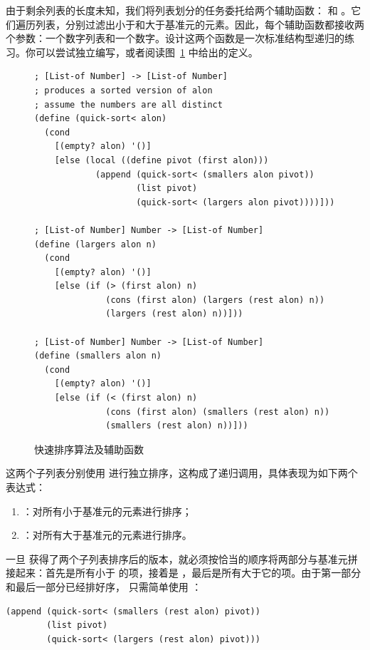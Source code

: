 由于剩余列表的长度未知，我们将列表划分的任务委托给两个辅助函数： 和 。它们遍历列表，分别过滤出小于和大于基准元的元素。因此，每个辅助函数都接收两个参数：一个数字列表和一个数字。设计这两个函数是一次标准结构型递归的练习。你可以尝试独立编写，或者阅读图~\ref{fig:quicksort-full} 中给出的定义。

\begin{figure}[htbp]
  \centering
\begin{lstlisting}[language=BSL, basicstyle=\scriptsize\ttfamily]
; [List-of Number] -> [List-of Number]
; produces a sorted version of alon
; assume the numbers are all distinct
(define (quick-sort< alon)
  (cond
    [(empty? alon) '()]
    [else (local ((define pivot (first alon)))
            (append (quick-sort< (smallers alon pivot))
                    (list pivot)
                    (quick-sort< (largers alon pivot))))]))

; [List-of Number] Number -> [List-of Number]
(define (largers alon n)
  (cond
    [(empty? alon) '()]
    [else (if (> (first alon) n)
              (cons (first alon) (largers (rest alon) n))
              (largers (rest alon) n))]))

; [List-of Number] Number -> [List-of Number]
(define (smallers alon n)
  (cond
    [(empty? alon) '()]
    [else (if (< (first alon) n)
              (cons (first alon) (smallers (rest alon) n))
              (smallers (rest alon) n))]))
\end{lstlisting}
  \caption{快速排序算法及辅助函数}
  \label{fig:quicksort-full}
\end{figure}

这两个子列表分别使用  进行独立排序，这构成了递归调用，具体表现为如下两个表达式：
\begin{enumerate}
  \item {}：对所有小于基准元的元素进行排序；
  \item {}：对所有大于基准元的元素进行排序。
\end{enumerate}

一旦  获得了两个子列表排序后的版本，就必须按恰当的顺序将两部分与基准元拼接起来：首先是所有小于  的项，接着是 ，最后是所有大于它的项。由于第一部分和最后一部分已经排好序， 只需简单使用 ：

\begin{lstlisting}[language=BSL]
(append (quick-sort< (smallers (rest alon) pivot))
        (list pivot)
        (quick-sort< (largers (rest alon) pivot)))
\end{lstlisting}

